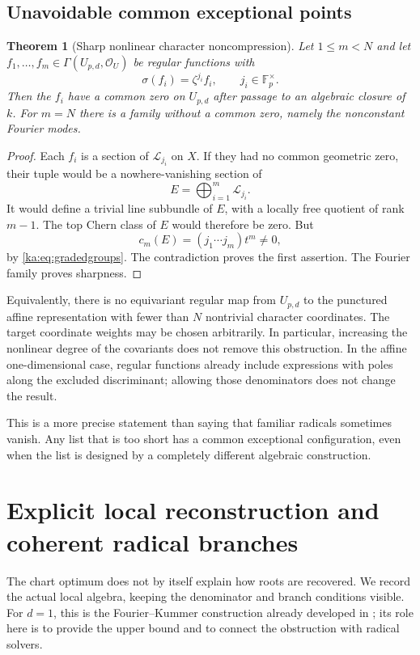 \documentclass[11pt,a4paper]{article}
\newtheorem{theorem}{Theorem}[section]
\theoremstyle{definition}
\theoremstyle{remark}
\newcommand{\F}{\mathbb F}
\newcommand{\OO}{\mathcal O}
\newcommand{\LL}{\mathcal L}
\begin{document}
\subsection{Unavoidable common exceptional points}
\begin{theorem}[Sharp nonlinear character noncompression]
\label{ka:thm:noncompression}
Let $1\leq m<N$ and let
$f_1,\ldots,f_m\in\Gamma(U_{p,d},\OO_U)$ be regular functions with
\[
 \sigma(f_i)=\zeta^{j_i}f_i,\qquad j_i\in\F_p^\times.
\]
Then the $f_i$ have a common zero on $U_{p,d}$ after passage to an
algebraic closure of $k$. For $m=N$ there is a family without a common
zero, namely the nonconstant Fourier modes.
\end{theorem}
\begin{proof}
Each $f_i$ is a section of $\LL_{j_i}$ on $X$. If they had no common
geometric zero, their tuple would be a nowhere-vanishing section of
\[
 E=\bigoplus_{i=1}^m\LL_{j_i}.
\]
It would define a trivial line subbundle of $E$, with a locally free
quotient of rank $m-1$. The top Chern class of $E$ would therefore be
zero. But
\[
 c_m(E)=(j_1\cdots j_m)t^m\neq0,
\]
by \eqref{ka:eq:gradedgroups}. The contradiction proves the first assertion.
The Fourier family proves sharpness.
\end{proof}

Equivalently, there is no equivariant regular map from $U_{p,d}$ to the
punctured affine representation with fewer than $N$ nontrivial character
coordinates. The target coordinate weights may be chosen arbitrarily.
In particular, increasing the nonlinear degree of the covariants does
not remove this obstruction. In the affine one-dimensional case,
regular functions already include expressions with poles along the
excluded discriminant; allowing those denominators does not change the
result.

This is a more precise statement than saying that familiar radicals
sometimes vanish. Any list that is too short has a common exceptional
configuration, even when the list is designed by a completely different
algebraic construction.

\section{Explicit local reconstruction and coherent radical branches}
\label{ka:sec:reconstruction}

The chart optimum does not by itself explain how roots are recovered.
We record the actual local algebra, keeping the denominator and branch
conditions visible. For $d=1$, this is the Fourier--Kummer construction
already developed in \cite{ka:ProveItReport}; its role here is to provide
the upper bound and to connect the obstruction with radical solvers.
\end{document}

